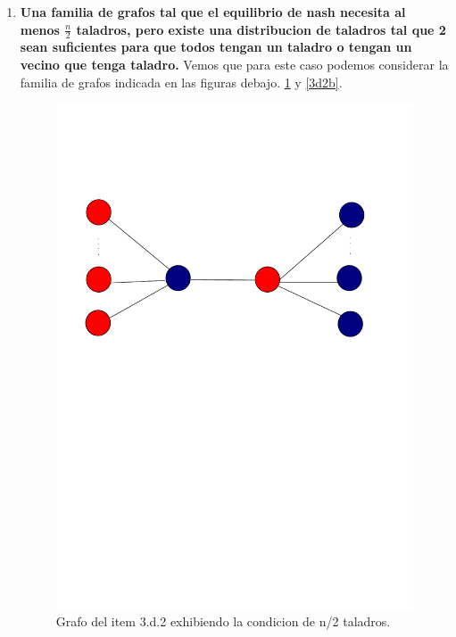 \begin{enumerate}
	\item \textbf{Una familia de grafos tal que el equilibrio de nash necesita al menos $\frac{n}{2}$ taladros, pero existe una distribucion de taladros tal que 2 sean suficientes para que todos tengan un taladro o tengan un vecino que tenga taladro.} Vemos que para este caso podemos considerar la familia de grafos indicada en las figuras debajo. \ref{3d2} y \ref{3d2b}.
	\begin{figure}[H]
		\label{3d2}
	  \centering	
		\includegraphics[scale=0.30]{fig/grafo3d2.pdf}
	  \caption{Grafo del item 3.d.2 exhibiendo la condicion de n/2 taladros.}
	\end{figure}


\end{enumerate}
